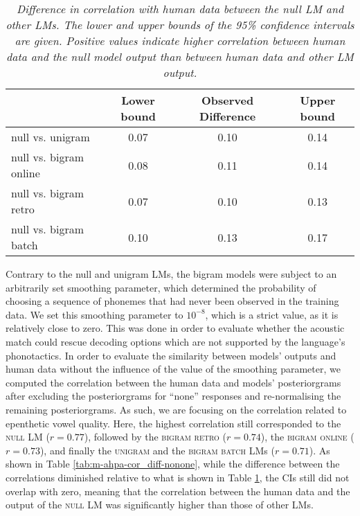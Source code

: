 {%
\begin{table}[htb!]
\centering
\caption{\textit{Difference in correlation with human data between the null LM and other LMs. The lower and upper bounds of the 95\% confidence intervals are given. Positive values indicate higher correlation between human data and the null model output than between human data and other LM output.}}
  \label{tab:m-ahpa-cor_diff}
\vspace{0.25cm}
\begin{tabular}{lccc}
  \toprule
 & Lower bound & Observed Difference & Upper bound \\  \midrule
null vs. unigram & 0.07 & 0.10 & 0.14 \\ 
  null vs. bigram online & 0.08 & 0.11 & 0.14 \\ 
  null vs. bigram retro & 0.07 & 0.10 & 0.13 \\ 
  null vs. bigram batch & 0.10 & 0.13 & 0.17 \\ \bottomrule 
\end{tabular}
\end{table}

Contrary to the null and unigram LMs, the bigram models were subject to an arbitrarily set smoothing parameter, which determined the probability of choosing a sequence of phonemes that had never been observed in the training data. We set this smoothing parameter to $10^{-8}$, which is a strict value, as it is relatively close to zero. This was done in order to evaluate whether the acoustic match could rescue decoding options which are not supported by the language's phonotactics. In order to evaluate the similarity between models' outputs and human data without the influence of the value of the smoothing parameter, we computed the correlation between the human data and models' posteriorgrams after excluding the posteriorgrams for ``none'' responses and re-normalising the remaining posteriorgrams. As such, we are focusing on the correlation related to epenthetic vowel quality.
Here, the highest correlation still corresponded to the \textsc{null} LM ($r = 0.77$), followed by the \textsc{bigram retro} ($r = 0.74$), the \textsc{bigram online} ($r = 0.73$), and finally the \textsc{unigram} and the \textsc{bigram batch} LMs ($r = 0.71$). 
As shown in Table \ref{tab:m-ahpa-cor_diff-nonone}, while the difference between the correlations diminished relative to what is shown in Table \ref{tab:m-ahpa-cor_diff}, the CIs still did not overlap with zero, meaning that the correlation between the human data and the output of the \textsc{null} LM was significantly higher than those of other LMs.  

}
